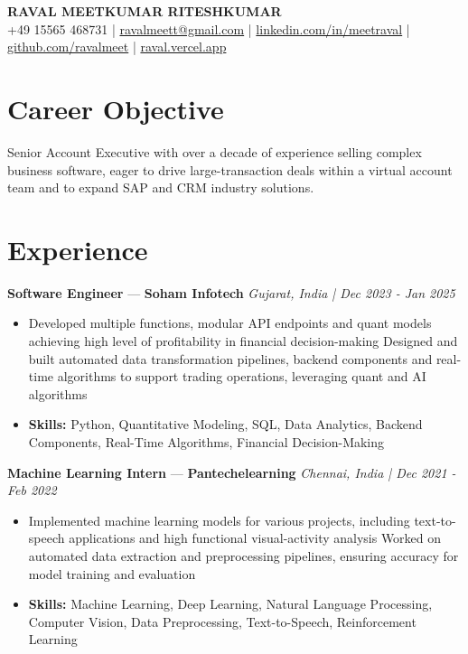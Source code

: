 \documentclass[a4paper,10pt]{article}
\begin{document}
\begin{center}
  {\Large\bfseries RAVAL MEETKUMAR RITESHKUMAR}\\[2pt]
  {\small +49 15565 468731 \;|\; \href{mailto:ravalmeett@gmail.com}{ravalmeett@gmail.com} \;|\; \href{https://www.linkedin.com/in/meetraval/}{linkedin.com/in/meetraval} \;|\; \href{https://github.com/ravalmeet}{github.com/ravalmeet} \;|\; \href{https://raval.vercel.app/}{raval.vercel.app}}
\end{center}
\vspace{-3pt}

\section*{Career Objective}
Senior Account Executive with over a decade of experience selling complex business software, eager to drive large-transaction deals within a virtual account team and to expand SAP and CRM industry solutions.\par

\section*{Experience}
\textbf{Software Engineer} — \textbf{Soham Infotech} \hfill \textit{Gujarat, India \;|\; Dec 2023 - Jan 2025}\par
\vspace{1pt}
\begin{itemize}
  \item Developed multiple functions, modular API endpoints and quant models achieving high level of profitability in financial decision-making Designed and built automated data transformation pipelines, backend components and real-time algorithms to support trading operations, leveraging quant and AI algorithms
  \item \textbf{Skills:} Python, Quantitative Modeling, SQL, Data Analytics, Backend Components, Real-Time Algorithms, Financial Decision-Making
\end{itemize}
\vspace{3pt}
\textbf{Machine Learning Intern} — \textbf{Pantechelearning} \hfill \textit{Chennai, India \;|\; Dec 2021 - Feb 2022}\par
\vspace{1pt}
\begin{itemize}
  \item Implemented machine learning models for various projects, including text-to-speech applications and high functional visual-activity analysis Worked on automated data extraction and preprocessing pipelines, ensuring accuracy for model training and evaluation
  \item \textbf{Skills:} Machine Learning, Deep Learning, Natural Language Processing, Computer Vision, Data Preprocessing, Text-to-Speech, Reinforcement Learning
\end{itemize}
\end{document}
